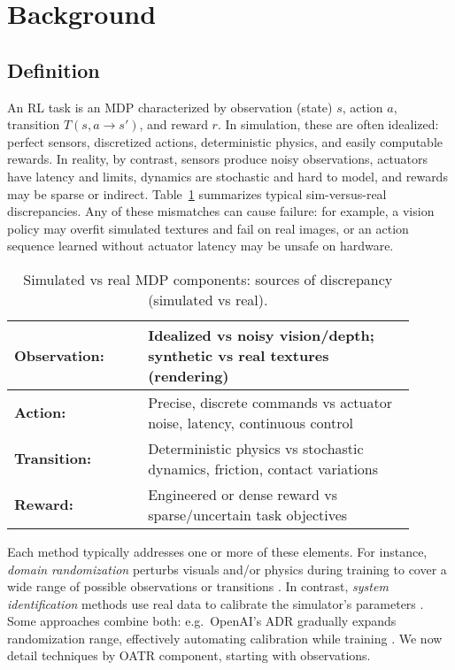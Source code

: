 \section{Background}
\subsection{Definition}
An RL task is an MDP characterized by observation (state) $s$, action $a$, transition $T(s,a\to s')$, and reward $r$. In simulation, these are often idealized: perfect sensors, discretized actions, deterministic physics, and easily computable rewards. In reality, by contrast, sensors produce noisy observations, actuators have latency and limits, dynamics are stochastic and hard to model, and rewards may be sparse or indirect. Table~\ref{tab:elements} summarizes typical sim-versus-real discrepancies. Any of these mismatches can cause failure: for example, a vision policy may overfit simulated textures and fail on real images, or an action sequence learned without actuator latency may be unsafe on hardware.

\begin{table}[htbp]
    \centering
    \caption{Simulated vs real MDP components: sources of discrepancy (simulated vs real).}
    \begin{tabular}{p{0.3\linewidth}p{0.6\linewidth}}
        \toprule
        \textbf{Observation:} & Idealized vs noisy vision/depth; synthetic vs real textures (rendering) \\
        \midrule
        \textbf{Action:} & Precise, discrete commands vs actuator noise, latency, continuous control \\
        \midrule
        \textbf{Transition:} & Deterministic physics vs stochastic dynamics, friction, contact variations \\
        \midrule
        \textbf{Reward:} & Engineered or dense reward vs sparse/uncertain task objectives \\
        \bottomrule
    \end{tabular}
    \label{tab:elements}
\end{table}

Each \simtoreal method typically addresses one or more of these elements. For instance, \emph{domain randomization} perturbs visuals and/or physics during training to cover a wide range of possible observations or transitions {\cite{Tobin2017,Sadeghi2017}}. In contrast, \emph{system identification} methods use real data to calibrate the simulator’s parameters {\cite{Chebotar2019}}. Some approaches combine both: e.g.\ OpenAI’s ADR gradually expands randomization range, effectively automating calibration while training {\cite{Akkaya2019}}. We now detail techniques by OATR component, starting with observations.